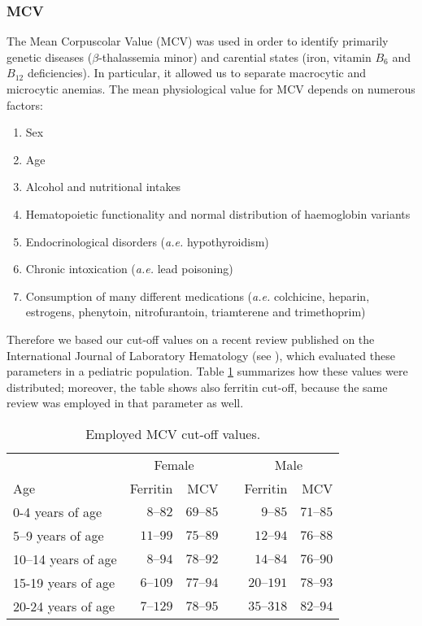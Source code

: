 \subsubsection{MCV}\label{sub:mcv}
The Mean Corpuscolar Value (MCV) was used in order to identify primarily genetic diseases ($\beta$-thalassemia minor) and carential states (iron, vitamin $B_{6}$ and $B_{12}$ deficiencies). In particular, it allowed us to separate macrocytic and microcytic anemias. The mean physiological value for MCV depends on numerous factors:

\begin{enumerate}
	\item Sex
	\item Age
	\item Alcohol and nutritional intakes
	\item Hematopoietic functionality and normal distribution of haemoglobin variants
	\item Endocrinological disorders (\textit{a.e.} hypothyroidism)
	\item Chronic intoxication (\textit{a.e.} lead poisoning)
	\item Consumption of many different medications (\textit{a.e.} colchicine, heparin, estrogens, phenytoin, nitrofurantoin, triamterene and trimethoprim)
\end{enumerate}

Therefore we based our cut-off values on a recent review published on the International Journal of Laboratory Hematology (see \cite{MCVferritincutoff}), which evaluated these parameters in a pediatric population. Table \ref{tab:cutoffmcv} summarizes how these values were distributed; moreover, the table shows also ferritin cut-off, because the same review was employed in that parameter as well.

\begin{table}[H]
   \centering
   \begin{tabular}{l r r c r r}
   	  & \multicolumn{2}{c}{Female} & & \multicolumn{2}{c}{Male}\\
   	 \cline{2-3} \cline{5-6}
      Age & Ferritin\footnotemark[4] & MCV\footnotemark[4] & & Ferritin\footnotemark[3] & MCV\footnotemark[4]\\
      \hline
      0-4 years of age & $8–82$ & $69–85$ & & $9–85$ & $71–85$\\
      5–9 years of age & $11–99$ & $75–89$ & & $12–94$ & $76–88$\\
      10–14 years of age & $8–94$ & $78–92$ & & $14–84$ & $76–90$\\
      15-19 years of age & $6–109$ & $77–94$ & & $20–191$ & $78–93$\\
      20-24 years of age & $7–129$ & $78–95$ & & $35–318$ & $82–94$\\
   \end{tabular}
   \caption{Employed MCV cut-off values.}
    \label{tab:cutoffmcv}
\end{table}

